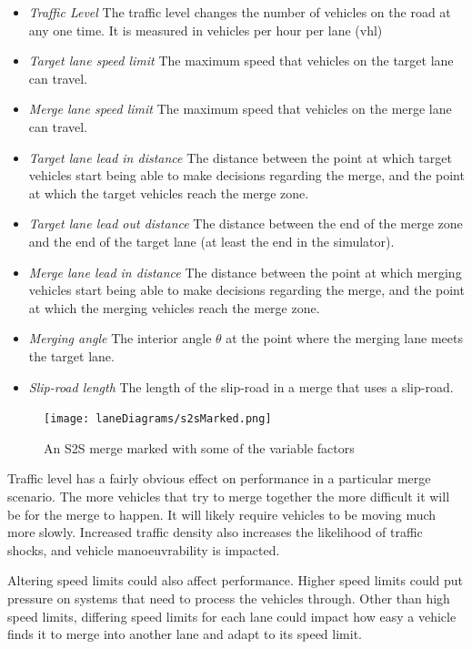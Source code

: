 \begin{itemize}
\item \textit{Traffic Level} 
The traffic level changes the number of vehicles on the road at any one time. It is measured in vehicles per hour per lane (\si{vhl})
\item \textit{Target lane speed limit}
The maximum speed that vehicles on the target lane can travel.
\item \textit{Merge lane speed limit}
The maximum speed that vehicles on the merge lane can travel.
\item \textit{Target lane lead in distance}
The distance between the point at which target vehicles start being able to make decisions regarding the merge, and the point at which the target vehicles reach the merge zone.
\item \textit{Target lane lead out distance}
The distance between the end of the merge zone and the end of the target lane (at least the end in the simulator).
\item \textit{Merge lane lead in distance}
The distance between the point at which merging vehicles start being able to make decisions regarding the merge, and the point at which the merging vehicles reach the merge zone.
\item \textit{Merging angle}
The interior angle $\theta$ at the point where the merging lane meets the target lane.
\item \textit{Slip-road length}
The length of the slip-road in a merge that uses a slip-road.
\end{itemize}

\begin{figure}[htb]
\texttt{[image: laneDiagrams/s2sMarked.png]}
\caption{An S2S merge marked with some of the variable factors}
\label{fig:s2sMarked}
\end{figure}

Traffic level has a fairly obvious effect on performance in a particular merge scenario. The more vehicles that try to merge together the more difficult it will be for the merge to happen. It will likely require vehicles to be moving much more slowly. Increased traffic density also increases the likelihood of traffic shocks, and vehicle manoeuvrability is impacted.

Altering speed limits could also affect performance. Higher speed limits could put pressure on systems that need to process the vehicles through. Other than high speed limits, differing speed limits for each lane could impact how easy a vehicle finds it to merge into another lane and adapt to its speed limit.

